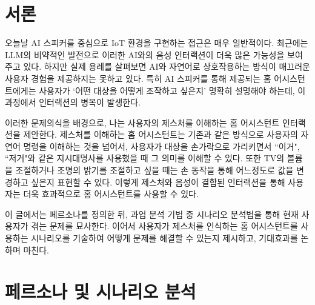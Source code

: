 \maketitle

\section{서론}




오늘날 AI 스피커를 중심으로 IoT 환경을 구현하는 접근은 매우 일반적이다. 최근에는 LLM의 비약적인 발전으로 이러한 AI와의 음성 인터랙션이 더욱 많은 가능성을 보여주고 있다. 하지만 실제 용례를 살펴보면 AI와 자연어로 상호작용하는 방식이 매끄러운 사용자 경험을 제공하지는 못하고 있다. 특히 AI 스피커를 통해 제공되는 홈 어시스턴트에게는 사용자가 `어떤 대상을 어떻게 조작하고 싶은지' 명확히 설명해야 하는데, 이 과정에서 인터랙션의 병목이 발생한다.

이러한 문제의식을 배경으로, 나는 사용자의 제스처를 이해하는 홈 어시스턴트 인터랙션을 제안한다. 제스처를 이해하는 홈 어시스턴트는 기존과 같은 방식으로 사용자의 자연어 명령을 이해하는 것을 넘어서, 사용자가 대상을 손가락으로 가리키면서 ``이거", ``저거"와 같은 지시대명사를 사용했을 때 그 의미를 이해할 수 있다. 또한 TV의 볼륨을 조절하거나 조명의 밝기를 조절하고 싶을 때는 손 동작을 통해 어느정도로 값을 변경하고 싶은지 표현할 수 있다. 이렇게 제스처와 음성이 결합된 인터랙션을 통해 사용자는 더욱 효과적으로 홈 어시스턴트를 사용할 수 있다.

이 글에서는 페르소나를 정의한 뒤, 과업 분석 기법 중 시나리오 분석법을 통해 현재 사용자가 겪는 문제를 묘사한다. 이어서 사용자가 제스처를 인식하는 홈 어시스턴트를 사용하는 시나리오를 기술하여 어떻게 문제를 해결할 수 있는지 제시하고, 기대효과를 논하며 마친다.

\section{페르소나 및 시나리오 분석}

